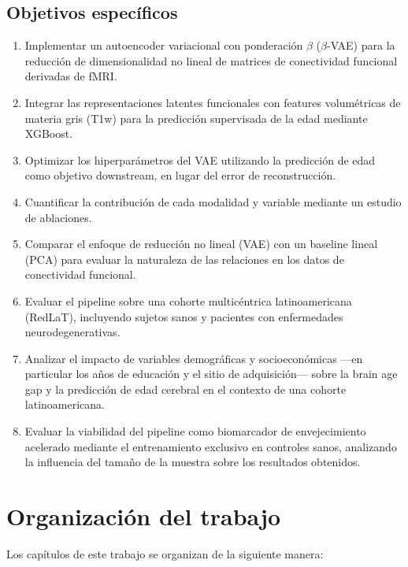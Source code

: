 \subsection{Objetivos específicos}

\begin{enumerate}
    \item Implementar un autoencoder variacional con ponderación $\beta$ ($\beta$-VAE) para la reducción de dimensionalidad no lineal de matrices de conectividad funcional derivadas de fMRI.
    \item Integrar las representaciones latentes funcionales con features volumétricas de materia gris (T1w) para la predicción supervisada de la edad mediante XGBoost.
    \item Optimizar los hiperparámetros del VAE utilizando la predicción de edad como objetivo downstream, en lugar del error de reconstrucción.
    \item Cuantificar la contribución de cada modalidad y variable mediante un estudio de ablaciones.
    \item Comparar el enfoque de reducción no lineal (VAE) con un baseline lineal (PCA) para evaluar la naturaleza de las relaciones en los datos de conectividad funcional.
    \item Evaluar el pipeline sobre una cohorte multicéntrica latinoamericana (RedLaT), incluyendo sujetos sanos y pacientes con enfermedades neurodegenerativas.
    \item Analizar el impacto de variables demográficas y socioeconómicas ---en particular los años de educación y el sitio de adquisición--- sobre la brain age gap y la predicción de edad cerebral en el contexto de una cohorte latinoamericana.
    \item Evaluar la viabilidad del pipeline como biomarcador de envejecimiento acelerado mediante el entrenamiento exclusivo en controles sanos, analizando la influencia del tamaño de la muestra sobre los resultados obtenidos.
\end{enumerate}


\section{Organización del trabajo}

Los capítulos de este trabajo se organizan de la siguiente manera:

